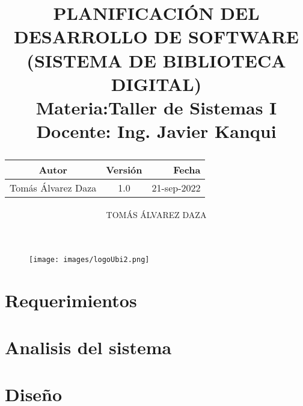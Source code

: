 \documentclass[10pt,letterpaper]{report}
\author{TOMÁS ÁLVAREZ DAZA}
\begin{document}
\begin{titlepage}
	\begin{figure}
		\texttt{[image: images/logoUbi2.png]}
	\end{figure}
	\title{PLANIFICACIÓN DEL DESARROLLO DE SOFTWARE\\
	(SISTEMA DE BIBLIOTECA DIGITAL)\\
	Materia:Taller de Sistemas I\\ 
	Docente: Ing. Javier Kanqui\\
	\vspace{1cm}

 \begin{tabular}{c|c|r}
	\hline
	Autor & Versión & Fecha \\
	\hline
	Tomás Álvarez Daza & 1.0 & 21-sep-2022 \\
	\hline
	\end{tabular}}
	
\end{titlepage}
\maketitle

\tableofcontents


%

\part{Requerimientos}
%
%


\part{Analisis del sistema} %




\part{Diseño}






\end{document}
